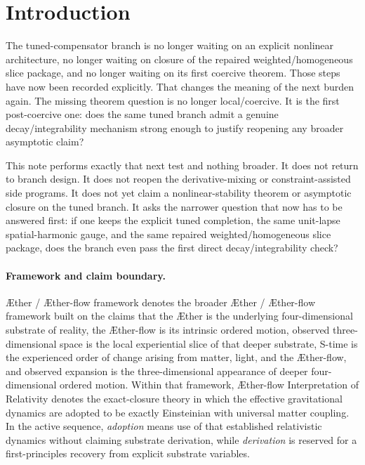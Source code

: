 \documentclass[11pt]{article}
\newcommand{\Aether}{\AE{}ther}
\newcommand{\Aflow}{\AE{}ther-flow}
\newcommand{\TheoryName}{\Aflow{} Interpretation of Relativity}
\newcommand{\TheoryProgram}{\Aether{} / \Aflow{} framework}
\begin{document}
\begin{abstract}
At current disciplined scope, the repository should therefore \emph{not} reopen broader asymptotic claims on this branch yet. The next honest theorem burden, if the tuned branch remains active, is a renormalized asymptotic test for the frozen scalar-momentum profile or a narrower momentum-suppressed sub-branch, not a direct decay bootstrap back to the exact flat background.
\end{abstract}

\section{Introduction}

The tuned-compensator branch is no longer waiting on an explicit nonlinear architecture, no longer waiting on closure of the repaired weighted/homogeneous slice package, and no longer waiting on its first coercive theorem. Those steps have now been recorded explicitly. That changes the meaning of the next burden again. The missing theorem question is no longer local/coercive. It is the first post-coercive one: does the same tuned branch admit a genuine decay/integrability mechanism strong enough to justify reopening any broader asymptotic claim?

This note performs exactly that next test and nothing broader. It does not return to branch design. It does not reopen the derivative-mixing or constraint-assisted side programs. It does not yet claim a nonlinear-stability theorem or asymptotic closure on the tuned branch. It asks the narrower question that now has to be answered first: if one keeps the explicit tuned completion, the same unit-lapse spatial-harmonic gauge, and the same repaired weighted/homogeneous slice package, does the branch even pass the first direct decay/integrability check?

\paragraph{Framework and claim boundary.}
\TheoryProgram{} denotes the broader \Aether{} / \Aflow{} framework built on the claims that the \Aether{} is the underlying four-dimensional substrate of reality, the \Aflow{} is its intrinsic ordered motion, observed three-dimensional space is the local experiential slice of that deeper substrate, S-time is the experienced order of change arising from matter, light, and the \Aflow{}, and observed expansion is the three-dimensional appearance of deeper four-dimensional ordered motion. Within that framework, \TheoryName{} denotes the exact-closure theory in which the effective gravitational dynamics are adopted to be exactly Einsteinian with universal matter coupling. In the active sequence, \emph{adoption} means use of that established relativistic dynamics without claiming substrate derivation, while \emph{derivation} is reserved for a first-principles recovery from explicit substrate variables.
\end{document}
